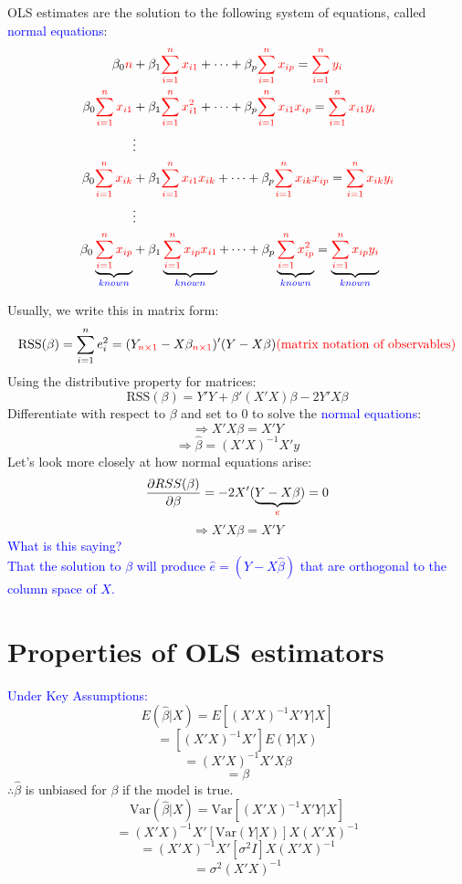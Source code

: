 \documentclass[14pt]{extarticle}
\begin{document}
\noindent
OLS estimates are the solution to the following system of equations, called \textcolor{blue}{normal equations}:
\[
\begin{aligned}
\beta_0 \textcolor{red}{n} &+ \beta_1 \textcolor{red}{\sum_{i=1}^{n} x_{i1}} + \dots + \beta_p \textcolor{red}{\sum_{i=1}^{n} x_{ip}} = \textcolor{red}{\sum_{i=1}^{n} y_i} \\
\beta_0 \textcolor{red}{\sum_{i=1}^{n} x_{i1}} &+ \beta_1 \textcolor{red}{\sum_{i=1}^{n} x_{i1}^2} + \dots + \beta_p \textcolor{red}{\sum_{i=1}^{n} x_{i1} x_{ip}} = \textcolor{red}{\sum_{i=1}^{n} x_{i1} y_i} \\
&\vdots \\
\beta_0 \textcolor{red}{\sum_{i=1}^{n} x_{ik}} &+ \beta_1 \textcolor{red}{\sum_{i=1}^{n} x_{i1} x_{ik}} + \dots + \beta_p \textcolor{red}{\sum_{i=1}^{n} x_{ik} x_{ip}} = \textcolor{red}{\sum_{i=1}^{n} x_{ik} y_i} \\
&\vdots \\
\beta_0 \underbrace{\textcolor{red}{\sum_{i=1}^{n} x_{ip}}}_{\textcolor{blue}{known}} &+ \beta_1 \underbrace{\textcolor{red}{\sum_{i=1}^{n} x_{ip} x_{i1}}}_{\textcolor{blue}{known}} + \dots + \beta_p \underbrace{\textcolor{red}{\sum_{i=1}^{n} x_{ip}^2}}_{\textcolor{blue}{known}} = \underbrace{\textcolor{red}{\sum_{i=1}^{n} x_{ip} y_i}}_{\textcolor{blue}{known}}
\end{aligned}
\]

\noindent
Usually, we write this in matrix form:
\[
\text{RSS}(\beta) = \sum_{i=1}^{n} e_i^2 = (Y_{\textcolor{red}{n \times 1}} - X\beta_{\textcolor{red}{n \times 1}})'(Y - X\beta)
{\textcolor{red}{\text{(matrix notation of observables)}}}
\]
Using the distributive property for matrices:
\[
\text{RSS}(\beta) = Y'Y + \beta'(X'X)\beta - 2Y'X\beta
\]
Differentiate with respect to $\beta$ and set to 0 to solve the \textcolor{blue}{normal equations}:
\[
\Rightarrow X'X \beta = X'Y
\]
\[
\Rightarrow \hat{\beta} = (X'X)^{-1}X'y
\]
\noindent
Let's look more closely at how normal equations arise:
\[
\frac{\partial RSS(\beta)}{\partial \beta} = -2X'(\underbrace{Y - X\beta}_{\textcolor{red}{e}}) = 0
\]
\[
\Rightarrow X'X\beta= X'Y
\]
\textcolor{blue}{What is this saying?} \\
\textcolor{blue}{That the solution to $\beta$ will produce $\hat{e} = (Y - X\hat{\beta})$} 
\textcolor{blue}{that are orthogonal to the column space of $X$.}

\newpage 
\section*{Properties of OLS estimators}
\noindent
\textcolor{blue}{Under Key Assumptions:}
\[
E(\hat{\beta} | X) = E[(X'X)^{-1}X'Y | X]
\]
\[
= [(X'X)^{-1}X']E(Y | X)
\]
\[
= (X'X)^{-1}X'X\beta
\]
\[
= \beta
\]
\noindent
$\therefore \hat{\beta}$ is unbiased for $\beta$ if the model is true.
\[
\text{Var}(\hat{\beta} | X) = \text{Var}[(X'X)^{-1}X'Y | X]
\]
\[
= (X'X)^{-1}X'[\text{Var}(Y | X)]X(X'X)^{-1}
\]
\[
= (X'X)^{-1}X'[\sigma^2 I]X(X'X)^{-1}
\]
\[
= \sigma^2 (X'X)^{-1}
\]
\end{document}
